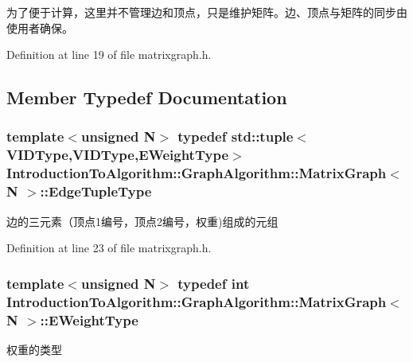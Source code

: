为了便于计算，这里并不管理边和顶点，只是维护矩阵。边、顶点与矩阵的同步由使用者确保。 

Definition at line 19 of file matrixgraph.\+h.



\subsection{Member Typedef Documentation}
\hypertarget{struct_introduction_to_algorithm_1_1_graph_algorithm_1_1_matrix_graph_ad698e07bacdb3f332c4f5d34bdb49463}{}
\subsubsection[{Edge\+Tuple\+Type}]{\setlength{\rightskip}{0pt plus 5cm}template$<$unsigned N$>$ typedef std\+::tuple$<${\bf V\+I\+D\+Type},{\bf V\+I\+D\+Type},{\bf E\+Weight\+Type}$>$ {\bf Introduction\+To\+Algorithm\+::\+Graph\+Algorithm\+::\+Matrix\+Graph}$<$ N $>$\+::{\bf Edge\+Tuple\+Type}}\label{struct_introduction_to_algorithm_1_1_graph_algorithm_1_1_matrix_graph_ad698e07bacdb3f332c4f5d34bdb49463}
边的三元素（顶点1编号，顶点2编号，权重)组成的元组 

Definition at line 23 of file matrixgraph.\+h.

\hypertarget{struct_introduction_to_algorithm_1_1_graph_algorithm_1_1_matrix_graph_af54dbf6d171b89b81b490de13f1fb02f}{}
\subsubsection[{E\+Weight\+Type}]{\setlength{\rightskip}{0pt plus 5cm}template$<$unsigned N$>$ typedef int {\bf Introduction\+To\+Algorithm\+::\+Graph\+Algorithm\+::\+Matrix\+Graph}$<$ N $>$\+::{\bf E\+Weight\+Type}}\label{struct_introduction_to_algorithm_1_1_graph_algorithm_1_1_matrix_graph_af54dbf6d171b89b81b490de13f1fb02f}
权重的类型 

